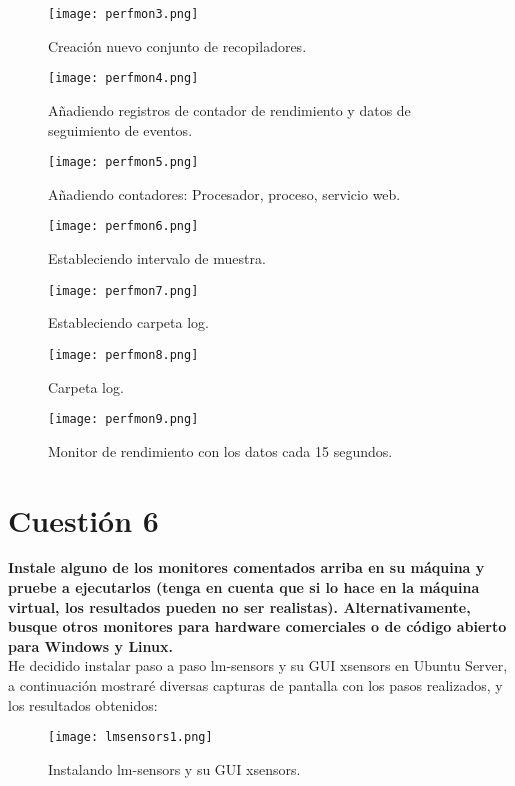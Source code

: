 \documentclass[a4paper, 11pt]{article} %
\begin{document}
\begin{figure}[H]
\centering 
\texttt{[image: perfmon3.png]} 
\caption{Creación nuevo conjunto de recopiladores.} 
\label{contexto:figura} 
\end{figure}
\begin{figure}[H]
\centering 
\texttt{[image: perfmon4.png]} 
\caption{Añadiendo registros de contador de rendimiento y datos de seguimiento de eventos.} 
\label{contexto:figura} 
\end{figure}
\begin{figure}[H]
\centering 
\texttt{[image: perfmon5.png]} 
\caption{Añadiendo contadores: Procesador, proceso, servicio web.} 
\label{contexto:figura} 
\end{figure}
\begin{figure}[H]
\centering 
\texttt{[image: perfmon6.png]} 
\caption{Estableciendo intervalo de muestra.} 
\label{contexto:figura} 
\end{figure}
\begin{figure}[H]
\centering 
\texttt{[image: perfmon7.png]} 
\caption{Estableciendo carpeta log.} 
\label{contexto:figura} 
\end{figure}
\begin{figure}[H]
\centering 
\texttt{[image: perfmon8.png]} 
\caption{Carpeta log.} 
\label{contexto:figura} 
\end{figure}
\begin{figure}[H]
\centering 
\texttt{[image: perfmon9.png]} 
\caption{Monitor de rendimiento con los datos cada 15 segundos.} 
\label{contexto:figura} 
\end{figure}

\pagebreak

\section{Cuestión 6}
\textbf{Instale alguno de los monitores comentados arriba en su máquina y pruebe a ejecutarlos (tenga en cuenta que si lo hace en la máquina virtual, los resultados pueden no ser realistas). Alternativamente, busque otros monitores para hardware comerciales o de código abierto para Windows y Linux.}\\

\cite{12}He decidido instalar paso a paso lm-sensors y su GUI xsensors en Ubuntu Server, a continuación mostraré diversas capturas de pantalla con los pasos realizados, y los resultados obtenidos:
\begin{figure}[H]
\centering 
\texttt{[image: lmsensors1.png]} 
\caption{Instalando lm-sensors y su GUI xsensors.} 
\label{contexto:figura} 
\end{figure}
\end{document}
